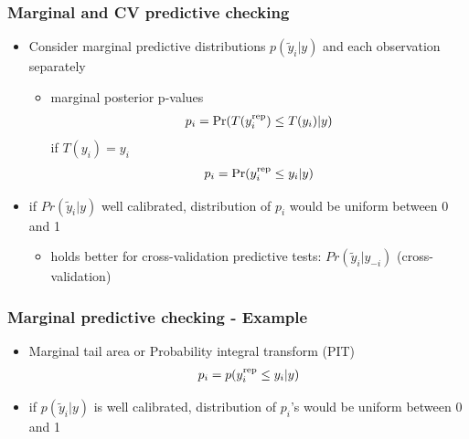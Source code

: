 \documentclass[10pt]{beamer}
\begin{document}

\begin{frame}[fragile]

\frametitle{Marginal and CV predictive checking}

  \begin{itemize}
  \item Consider marginal predictive distributions $p(\tilde{y}_i|y)$
    and each observation separately
    \begin{itemize}
    \item marginal posterior p-values
      \begin{align*}
        p_i = \mbox{Pr}(T(y_i^{\operatorname{\mathrm{rep}}}) \leq T(y_i) | y)
      \end{align*}
      if $T(y_i)=y_i$
      \begin{align*}
        p_i = \mbox{Pr}(y_i^{\operatorname{\mathrm{rep}}} \leq y_i | y)
      \end{align*}
    \end{itemize}
  \item<2-> if $Pr(\tilde{y}_i|y)$ well calibrated, distribution of $p_i$
    would be uniform between 0 and 1
    \begin{itemize}
    \item holds better for cross-validation predictive tests: $Pr(\tilde{y}_i|y_{-i})$
      (cross-validation)
    \end{itemize}
  \end{itemize}

\end{frame}

\begin{frame}[fragile]

\frametitle{Marginal predictive checking - Example}

  \begin{itemize}
  \item Marginal tail area or Probability integral transform (PIT)
    \begin{align*}
      p_i = p(y_i^{\operatorname{\mathrm{rep}}} \leq y_i | y)
    \end{align*}
  \item if $p(\tilde{y}_i|y)$ is well calibrated, distribution of $p_i$'s
    would be uniform between 0 and 1
  \end{itemize}
  \vspace{-1.5\baselineskip}

\end{frame}
\end{document}
